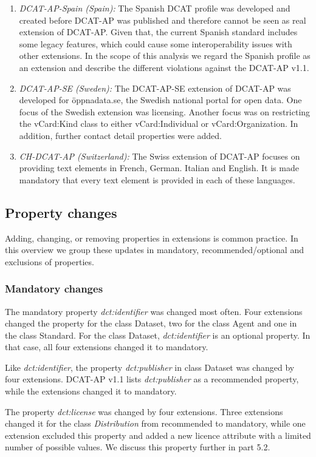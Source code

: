 \documentclass[<options>]{elsarticle}
\begin{document}
\begin{enumerate}
\item \textit{DCAT-AP-Spain (Spain):} The Spanish DCAT profile was developed and created before DCAT-AP was published and therefore cannot be seen as real extension of DCAT-AP. Given that, the current Spanish standard includes some legacy features, which could cause some interoperability issues with other extensions. In the scope of this analysis we regard the Spanish profile as an extension and describe the different violations against the DCAT-AP v1.1.

\item \textit{DCAT-AP-SE (Sweden):} The DCAT-AP-SE extension of DCAT-AP was developed for öppnadata.se, the Swedish national portal for open data. One focus of the Swedish extension was licensing. Another focus was on restricting the vCard:Kind class to either vCard:Individual or vCard:Organization. In addition, further contact detail properties were added. 

\item \textit{CH-DCAT-AP (Switzerland):} The Swiss extension of DCAT-AP focuses on providing text elements in French, German. Italian and English. It is made mandatory that every text element is provided in each of these languages. 
\end{enumerate}

\subsection{Property changes}
Adding, changing, or removing properties in extensions is common practice. In this overview we group these updates in mandatory, recommended/optional and exclusions of properties. 

\subsubsection{Mandatory changes}
The mandatory property \textit{dct:identifier} was changed most often. Four extensions changed the property for the class Dataset, two for the class Agent and one in the class Standard. For the class Dataset, \textit{dct:identifier} is an optional property. In that case, all four extensions changed it to mandatory.

Like \textit{dct:identifier}, the property \textit{dct:publisher} in class Dataset was changed by four extensions. DCAT-AP v1.1 lists \textit{dct:publisher} as a recommended property, while the extensions changed it to mandatory.

The property \textit{dct:license} was changed by four extensions. Three extensions changed it for the class \textit{Distribution} from recommended to mandatory, while one extension excluded this property and added a new licence attribute with a limited number of possible values. We discuss this property further in part 5.2.
\end{document}

